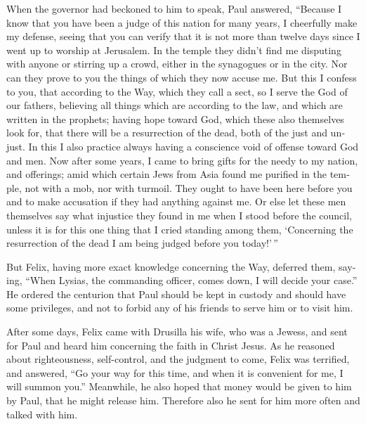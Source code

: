 \begin{paracol}{2}
\begin{otherlanguage}{english}
 When the governor had beckoned to him to speak, Paul
answered, ``Because I know that you have been a judge of this nation for
many years, I cheerfully make my defense,  seeing that
you can verify that it is not more than twelve days since I went up to
worship at Jerusalem.  In the temple they didn't find me
disputing with anyone or stirring up a crowd, either in the synagogues
or in the city.  Nor can they prove to you the things of
which they now accuse me.  But this I confess to you,
that according to the Way, which they call a sect, so I serve the God of
our fathers, believing all things which are according to the law, and
which are written in the prophets;  having hope toward
God, which these also themselves look for, that there will be a
resurrection of the dead, both of the just and unjust. 
In this I also practice always having a conscience void of offense
toward God and men.  Now after some years, I came to
bring gifts for the needy to my nation, and offerings; 
amid which certain Jews from Asia found me purified in the temple, not
with a mob, nor with turmoil.  They ought to have been
here before you and to make accusation if they had anything against me.
 Or else let these men themselves say what injustice they
found in me when I stood before the council,  unless it
is for this one thing that I cried standing among them, `Concerning the
resurrection of the dead I am being judged before you today!'\,''

 But Felix, having more exact knowledge concerning the
Way, deferred them, saying, ``When Lysias, the commanding officer, comes
down, I will decide your case.''  He ordered the
centurion that Paul should be kept in custody and should have some
privileges, and not to forbid any of his friends to serve him or to
visit him.

 After some days, Felix came with Drusilla his wife, who
was a Jewess, and sent for Paul and heard him concerning the faith in
Christ Jesus.  As he reasoned about righteousness,
self-control, and the judgment to come, Felix was terrified, and
answered, ``Go your way for this time, and when it is convenient for me,
I will summon you.''  Meanwhile, he also hoped that money
would be given to him by Paul, that he might release him. Therefore also
he sent for him more often and talked with him.


\end{otherlanguage}
\end{paracol}
